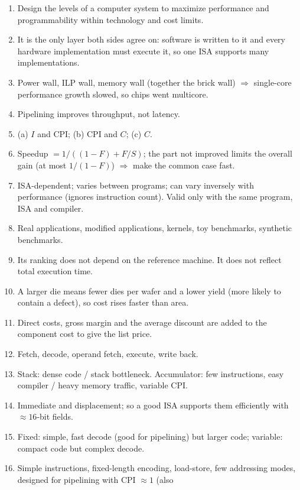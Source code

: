 \documentclass[11pt]{article}
\begin{document}
\begin{enumerate}[label=\textbf{A\arabic*.},leftmargin=*]
  \item Design the levels of a computer system to maximize performance and
  programmability within technology and cost limits.
  \item It is the only layer both sides agree on: software is written to it
  and every hardware implementation must execute it, so one ISA supports
  many implementations.
  \item Power wall, ILP wall, memory wall (together the brick wall)
  $\Rightarrow$ single-core performance growth slowed, so chips went
  multicore.
  \item Pipelining improves throughput, not latency.
  \item (a) $I$ and CPI; (b) CPI and $C$; (c) $C$.
  \item Speedup $=1/((1-F)+F/S)$; the part not improved limits the overall
  gain (at most $1/(1-F)$) $\Rightarrow$ make the common case fast.
  \item ISA-dependent; varies between programs; can vary inversely with
  performance (ignores instruction count). Valid only with the same program,
  ISA and compiler.
  \item Real applications, modified applications, kernels, toy benchmarks,
  synthetic benchmarks.
  \item Its ranking does not depend on the reference machine. It does not
  reflect total execution time.
  \item A larger die means fewer dies per wafer and a lower yield (more
  likely to contain a defect), so cost rises faster than area.
  \item Direct costs, gross margin and the average discount are added to the
  component cost to give the list price.
  \item Fetch, decode, operand fetch, execute, write back.
  \item Stack: dense code / stack bottleneck. Accumulator: few instructions,
  easy compiler / heavy memory traffic, variable CPI.
  \item Immediate and displacement; so a good ISA supports them efficiently
  with $\approx16$-bit fields.
  \item Fixed: simple, fast decode (good for pipelining) but larger code;
  variable: compact code but complex decode.
  \item Simple instructions, fixed-length encoding, load-store, few
  addressing modes, designed for pipelining with CPI $\approx1$ (also

\end{enumerate}
\end{document}
